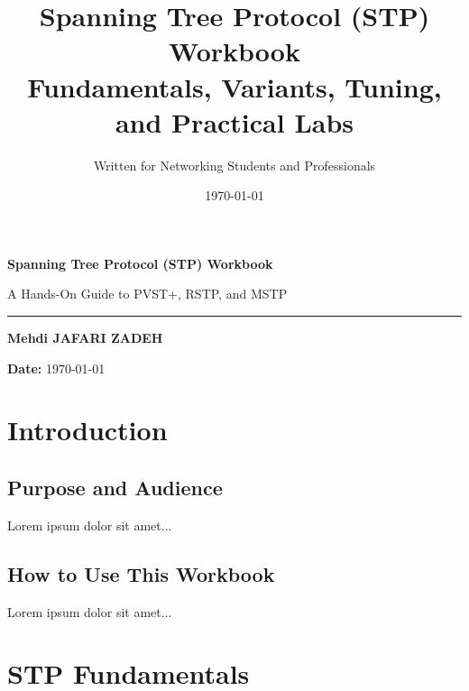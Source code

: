 \documentclass[12pt]{report}
\title{\Huge \textbf{Spanning Tree Protocol (STP) Workbook}\\
       \Large Fundamentals, Variants, Tuning, and Practical Labs}
\author{\Large Written for Networking Students and Professionals}
\date{\today}
\begin{document}
\begin{titlepage}
    \centering

    \vspace*{4cm}
    {\Huge \textbf{Spanning Tree Protocol (STP) Workbook}\par}
    \vspace{0.8cm}
    {\Large A Hands-On Guide to PVST+, RSTP, and MSTP\par}
    \vspace{0.3cm}
    \rule{0.9\textwidth}{1pt}
    \vspace{0.6cm}
    {\large \textbf{Mehdi JAFARI ZADEH}}\par
    \vspace{0.3cm}

    
    \vfill
    \textbf{Date:} \today
    \vspace{2cm}
\end{titlepage}

\tableofcontents
\newpage

\chapter{Introduction}

\section{Purpose and Audience}
Lorem ipsum dolor sit amet...

\section{How to Use This Workbook}
Lorem ipsum dolor sit amet...

\chapter{STP Fundamentals}
\end{document}
